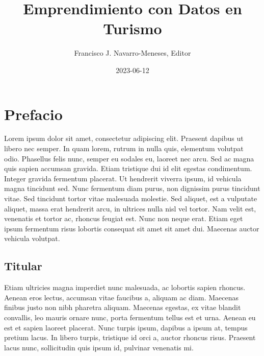 \documentclass[
  letterpaper,
  DIV=11,
  numbers=noendperiod]{scrreprt}
\title{Emprendimiento con Datos en Turismo}
\author{Francisco J. Navarro-Meneses, Editor}
\date{2023-06-12}
\renewcommand*\contentsname{Table of contents}
\newcommand\contentsname{Table of contents}
\begin{document}
\maketitle
\ifdefined\Shaded\renewenvironment{Shaded}{\begin{tcolorbox}[interior hidden, borderline west={3pt}{0pt}{shadecolor}, enhanced, boxrule=0pt, frame hidden, breakable, sharp corners]}{\end{tcolorbox}}\fi

\renewcommand*\contentsname{Table of contents}
{
\hypersetup{linkcolor=}
\setcounter{tocdepth}{2}
\tableofcontents
}

\hypertarget{prefacio}{%
\chapter*{Prefacio}\label{prefacio}}


Lorem ipsum dolor sit amet, consectetur adipiscing elit. Praesent
dapibus ut libero nec semper. In quam lorem, rutrum in nulla quis,
elementum volutpat odio. Phasellus felis nunc, semper eu sodales eu,
laoreet nec arcu. Sed ac magna quis sapien accumsan gravida. Etiam
tristique dui id elit egestas condimentum. Integer gravida fermentum
placerat. Ut hendrerit viverra ipsum, id vehicula magna tincidunt sed.
Nunc fermentum diam purus, non dignissim purus tincidunt vitae. Sed
tincidunt tortor vitae malesuada molestie. Sed aliquet, est a vulputate
aliquet, massa erat hendrerit arcu, in ultrices nulla nisl vel tortor.
Nam velit est, venenatis et tortor ac, rhoncus feugiat est. Nunc non
neque erat. Etiam eget ipsum fermentum risus lobortis consequat sit amet
sit amet dui. Maecenas auctor vehicula volutpat.

\hypertarget{titular}{%
\section*{Titular}\label{titular}}


Etiam ultricies magna imperdiet nunc malesuada, ac lobortis sapien
rhoncus. Aenean eros lectus, accumsan vitae faucibus a, aliquam ac diam.
Maecenas finibus justo non nibh pharetra aliquam. Maecenas egestas, ex
vitae blandit convallis, leo mauris ornare nunc, porta fermentum tellus
est et urna. Aenean eu est et sapien laoreet placerat. Nunc turpis
ipsum, dapibus a ipsum at, tempus pretium lacus. In libero turpis,
tristique id orci a, auctor rhoncus risus. Praesent lacus nunc,
sollicitudin quis ipsum id, pulvinar venenatis mi.
\end{document}
